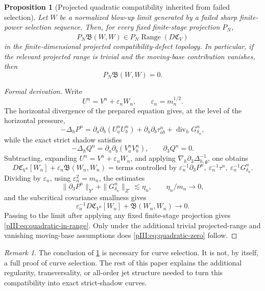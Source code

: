\documentclass[11pt]{article}
\numberwithin{equation}{section}
\theoremstyle{plain}
\newtheorem{proposition}{Proposition}[section]
\theoremstyle{definition}
\theoremstyle{remark}
\newtheorem{remark}{Remark}[section]
\DeclareMathOperator{\Range}{Range}
\newcommand{\eps}{\varepsilon}
\newcommand{\nabh}{\nabla_h}
\newcommand{\calB}{\mathfrak B}
\newcommand{\calC}{\mathfrak C}
\begin{document}
\begin{proposition}[Projected quadratic compatibility inherited from failed selection]\label{pIII:prop:quadratic-compatibility-inherited}
Let \(W\) be a normalized blow-up limit generated by a failed sharp finite-power
selection sequence.  Then, for every fixed finite-stage projection \(P_N\),
\begin{equation}\label{pIII:eq:quadratic-in-range}
        P_N\calB(W,W)
        \in
        \overline{P_N\Range(D\calC_V)}
\end{equation}
in the finite-dimensional projected compatibility-defect topology.  In particular, if the relevant projected range is trivial and the moving-base contribution vanishes, then
\begin{equation}\label{pIII:eq:quadratic-zero}
        P_N\calB(W,W)=0.
\end{equation}
\end{proposition}

\begin{proof}[Formal derivation]
Write
\[
        U^n=V^n+\eps_nW_n,
        \qquad
        \eps_n=m_n^{1/2}.
\]
The horizontal divergence of the prepared equation gives, at the level of the horizontal
pressure,
\[
        -\Delta_hP^n
        =
        \partial_a\partial_b(U^n_aU^n_b)
        +\partial_a\partial_b\tau^n_{ab}
        +\operatorname{div}_hG^n_{\delta_n},
\]
while the exact strict shadow satisfies
\[
        -\Delta_hQ^n
        =
        \partial_a\partial_b(V^n_aV^n_b),
        \qquad
        \partial_3Q^n=0.
\]
Subtracting, expanding \(U^n=V^n+\eps_nW_n\), and applying
\(\nabh\partial_3\Delta_{h,\mathfrak g}^{-1}\), one obtains
\[
        D\calC_{V^n}[W_n]
        +\eps_n\calB(W_n,W_n)
        =
        \text{terms controlled by }\eps_n^{-1}\partial_3P^n,
        \ \eps_n^{-1}\tau^n,
        \ \eps_n^{-1}G^n_{\delta_n}.
\]
Dividing by \(\eps_n\), using \(\eps_n^2=m_n\), the estimates
\[
        \|\partial_3P^n\|_{Y'}+
        \|G^n_{\delta_n}\|_{Z'}
        \lesssim \eta_n,
        \qquad
        \eta_n/m_n\to0,
\]
and the subcritical covariance smallness gives
\[
        \eps_n^{-1}D\calC_{V^n}[W_n]+
        \calB(W_n,W_n)\to0.
\]
Passing to the limit after applying any fixed finite-stage projection gives \eqref{pIII:eq:quadratic-in-range}.  Only under the additional trivial projected-range and vanishing moving-base assumptions does \eqref{pIII:eq:quadratic-zero} follow.
\end{proof}

\begin{remark}
The conclusion of \cref{pIII:prop:quadratic-compatibility-inherited} is necessary for curve
selection.  It is not, by itself, a full proof of curve selection.  The rest of this paper
explains the additional regularity, transversality, or all-order jet structure needed to
turn this compatibility into exact strict-shadow curves.
\end{remark}
\end{document}
